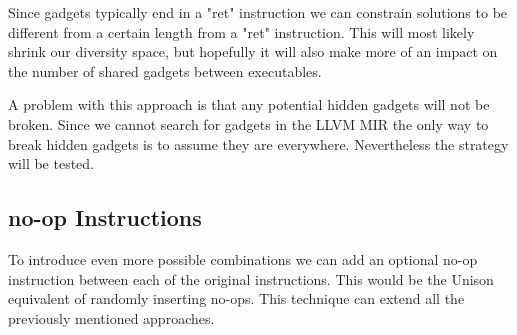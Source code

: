 Since gadgets typically end in a "ret" instruction we can constrain solutions to be different
from a certain length from a "ret" instruction. This will most likely shrink our diversity
space, but hopefully it will also make more of an impact on the number of shared gadgets
between executables.

A problem with this approach is that any potential hidden gadgets will not be broken. Since
we cannot search for gadgets in the LLVM MIR the only way to break hidden gadgets is to
assume they are everywhere. Nevertheless the strategy will be tested.

\subsection{no-op Instructions}

To introduce even more possible combinations we can add an optional no-op instruction
between each of the original instructions. This would be the Unison equivalent of randomly
inserting no-ops. This technique can extend all the previously mentioned approaches.
